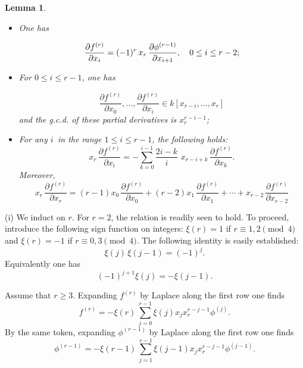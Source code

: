 \documentclass[11pt]{article}   %
\newtheorem{Lemma}[Theorem]{Lemma}
\theoremstyle{definition}
\numberwithin{Theorem}{section} \numberwithin{equation}{section}
\def\demo{\noindent{\it Proof. }}
\begin{document}
{\begin{Lemma}
\begin{itemize}
\item[{\rm (i)}] One has

\begin{equation}\label{phased_out_r}
\frac{\partial f^{(r)}}{\partial x_i}=(-1)^r\, x_r\, \frac{\partial
\phi^{(r-1)}}{\partial x_{i+1}}, \quad 0\leq i\leq r-2{\rm ;}
\end{equation}

\item[{\rm (ii)}] For $0\leq i\leq r-1$, one has

\begin{equation}\label{g.c.d.s}
\frac {\partial f^{(r)} } {\partial x_0}, \ldots, \frac{\partial
f^{(r)} } {\partial x_i}  \in k\left[x_{r-i},\ldots,x_{r}\right]
\end{equation}
and the g.c.d. of these partial derivatives is $x_r^{r-i-1}${\rm ;}
\item[{\rm (iii)}] For any $i\,$ in the range $1\leq i\leq r-1$, the following holds:
\begin{equation}\label{basic_linear_relation}
x_r\,\frac{\partial f^{(r)} }{\partial
x_i}=-\sum_{k=0}^{i-1}\frac{2i-k}{i}\,\, x_{r-i+k}\, \frac{\partial
f^{(r)} }{\partial x_k}.
\end{equation}
Moreover,
\begin{equation}\label{perfect_linear_relation}
x_r\, \frac{\partial f^{(r)} }{\partial x_r}=(r-1)x_0\,\frac{\partial
f^{(r)} }{\partial x_0}+ (r-2)x_1\, \frac{\partial f^{(r)}}{\partial
x_1}+\cdots + x_{r-2}\,\frac{\partial f^{(r)}} {\partial x_{r-2}}
\end{equation}
\end{itemize}
\end{Lemma}

\demo (i) We induct on $r$. For $r=2$, the relation is readily seen
to hold. To proceed, introduce the following sign function on
integers: $\xi(r)=1$ if $r\equiv 1,2 \pmod{4}$ and $\xi(r)=-1$ if
$r\equiv 0,3 \pmod{4}$. The following identity is easily
established:
\begin{equation}\label{identity1}
\xi(j)\,\xi(j-1)=(-1)^j.
\end{equation}
Equivalently one has
\begin{equation}\label{identity2}
(-1)^{j+1}\xi(j)=-\xi(j-1).
\end{equation}


Assume that $r\geq 3$. Expanding $f^{(r)}$ by Laplace along the
first row one finds
\begin{equation}\label{Laplace_first_row}
f^{(r)}=-\xi(r)\,\sum_{j=0}^{r-1}\xi({j}) x_j
x_r^{r-j-1}\phi^{(j)}.
\end{equation}
By the same token, expanding $\phi^{(r-1)}$ by Laplace along the first
row one finds
\begin{equation}\label{Laplace_first_row_1}
\phi^{(r-1)}=-\xi(r-1)\,\sum_{j=1}^{r-1}\xi(j-1) x_j
x_r^{r-j-1}\phi^{(j-1)}.
\end{equation}


}
\end{document}
